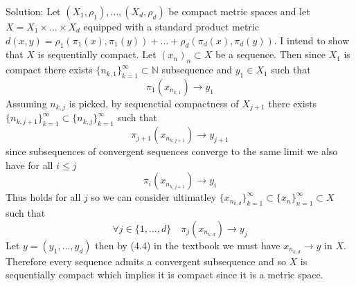 \documentclass[11pt]{article}
\newcommand{\solution}[1]{{{\textcolor{header}{Solution:} \textcolor{solution}{#1}}}}
\begin{document}
\solution{
    Let $(X_1,\rho_1),\dots,(X_d,\rho_d)$ be compact metric spaces and let  $X = X_1\times\dots\times X_d$ equipped with a standard product metric $d(x,y) = \rho_1(\pi_1(x),\pi_1(y)) + \dots + \rho_d(\pi_d(x),\pi_d(y))$.
    I intend to show that $X$ is sequentially compact. Let $(x_n)_n \subset X$ be a sequence.
    Then since $X_1$ is compact there exists $\{n_{k,1}\}_{k=1}^{\infty} \subset \mathbb{N}$ subsequence and $y_1 \in X_1$ such that
    \[\pi_1(x_{n_{k,1}}) \to y_1 \]
    Assuming $n_{k,j}$ is picked, by sequenctial compactness of $X_{j+1}$ there exists  $\{n_{k,j+1}\}_{k=1}^{\infty} \subset \{n_{k,j}\}_{k=1}^{\infty}$ such that
    \[
        \pi_{j+1}(x_{n_{k,j+1}}) \to y_{j+1}
    \] 
    since subsequences of convergent sequences converge to the same limit we also have for all $i \le j$
     \[
         \pi_i(x_{n_{k,j+1}}) \to y_i
    \] 
    Thus holds for all $j$ so we can consider ultimatley  $\{x_{n_{k,d}}\}_{k=1}^{\infty} \subset \{x_n\}_{n=1}^{\infty} \subset X$ such that
    \[
        \forall j \in \{1,\dots,d\} \quad \pi_j(x_{n_{k,d}}) \to y_j
    \] 
    Let $y = (y_1,\dots,y_d)$ then by (4.4) in the textbook we must have $x_{n_{k,d}} \to y$ in  $X$. Therefore
    every sequence admits a convergent subsequence and so  $X$ is sequentially compact which implies it is compact since it is a metric space.
}
\end{document}
